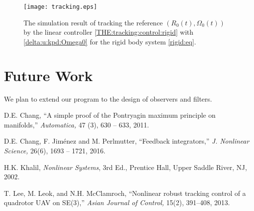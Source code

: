 \documentclass[letterpaper, 10 pt, conference]{ieeeconf}  %
\begin{document}
\begin{figure}[tb]
\begin{center}
\texttt{[image: tracking.eps]}
\end{center}
\caption{\label{figure.tracking:rigid}  The simulation result of tracking the reference $(R_0(t), \Omega_0(t))$ by the linear controller  \eqref{THE:tracking:control:rigid} with \eqref{delta:u:kpd:Omega0}  for the rigid body system \eqref{rigid:eq}.}
\end{figure}

\section{Future Work}
We plan to extend our program to the design of observers and filters. 
%




\begin{thebibliography}{99}

D.E. Chang, ``A simple proof of the Pontryagin maximum principle on manifolds,'' {\it Automatica,}  47 (3), 630 -- 633, 2011.

D.E. Chang, F. Jim\'{e}nez and M. Perlmutter, ``Feedback integrators,'' {\it J. Nonlinear Science,}  26(6), 1693 -- 1721, 2016.


H.K.  Khalil, {\it Nonlinear Systems}, 3rd Ed., Prentice Hall, Upper Saddle River, NJ, 2002.


 T. Lee, M. Leok, and N.H. McClamroch, ``Nonlinear robust tracking control of a quadrotor UAV on SE(3),'' {\it  Asian Journal of Control,} 15(2), 391--408, 2013.

\end{thebibliography}
\end{document}

